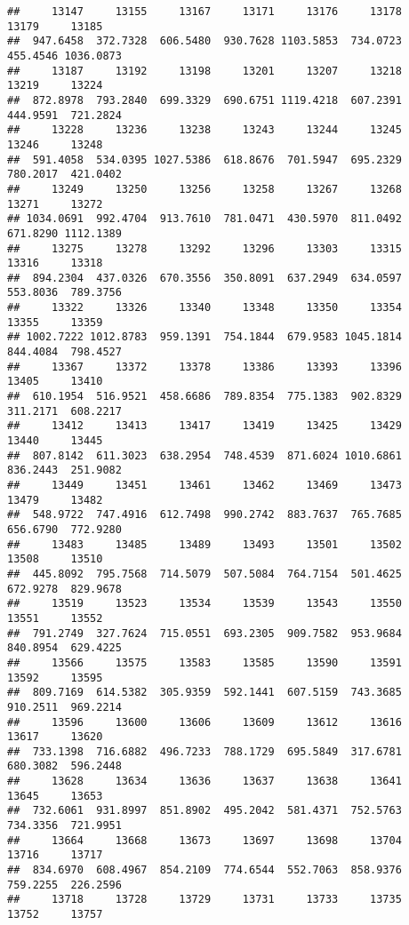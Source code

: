 \documentclass[
]{article}
\begin{document}
\begin{verbatim}
##     13147     13155     13167     13171     13176     13178     13179     13185 
##  947.6458  372.7328  606.5480  930.7628 1103.5853  734.0723  455.4546 1036.0873 
##     13187     13192     13198     13201     13207     13218     13219     13224 
##  872.8978  793.2840  699.3329  690.6751 1119.4218  607.2391  444.9591  721.2824 
##     13228     13236     13238     13243     13244     13245     13246     13248 
##  591.4058  534.0395 1027.5386  618.8676  701.5947  695.2329  780.2017  421.0402 
##     13249     13250     13256     13258     13267     13268     13271     13272 
## 1034.0691  992.4704  913.7610  781.0471  430.5970  811.0492  671.8290 1112.1389 
##     13275     13278     13292     13296     13303     13315     13316     13318 
##  894.2304  437.0326  670.3556  350.8091  637.2949  634.0597  553.8036  789.3756 
##     13322     13326     13340     13348     13350     13354     13355     13359 
## 1002.7222 1012.8783  959.1391  754.1844  679.9583 1045.1814  844.4084  798.4527 
##     13367     13372     13378     13386     13393     13396     13405     13410 
##  610.1954  516.9521  458.6686  789.8354  775.1383  902.8329  311.2171  608.2217 
##     13412     13413     13417     13419     13425     13429     13440     13445 
##  807.8142  611.3023  638.2954  748.4539  871.6024 1010.6861  836.2443  251.9082 
##     13449     13451     13461     13462     13469     13473     13479     13482 
##  548.9722  747.4916  612.7498  990.2742  883.7637  765.7685  656.6790  772.9280 
##     13483     13485     13489     13493     13501     13502     13508     13510 
##  445.8092  795.7568  714.5079  507.5084  764.7154  501.4625  672.9278  829.9678 
##     13519     13523     13534     13539     13543     13550     13551     13552 
##  791.2749  327.7624  715.0551  693.2305  909.7582  953.9684  840.8954  629.4225 
##     13566     13575     13583     13585     13590     13591     13592     13595 
##  809.7169  614.5382  305.9359  592.1441  607.5159  743.3685  910.2511  969.2214 
##     13596     13600     13606     13609     13612     13616     13617     13620 
##  733.1398  716.6882  496.7233  788.1729  695.5849  317.6781  680.3082  596.2448 
##     13628     13634     13636     13637     13638     13641     13645     13653 
##  732.6061  931.8997  851.8902  495.2042  581.4371  752.5763  734.3356  721.9951 
##     13664     13668     13673     13697     13698     13704     13716     13717 
##  834.6970  608.4967  854.2109  774.6544  552.7063  858.9376  759.2255  226.2596 
##     13718     13728     13729     13731     13733     13735     13752     13757 

\end{verbatim}
\end{document}
